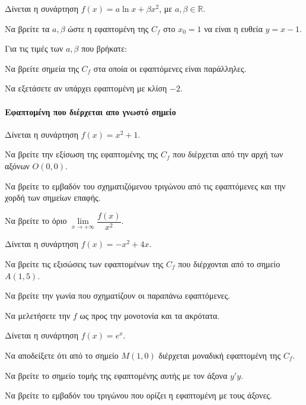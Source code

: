 \documentclass[11pt,a4paper,modern]{FFExercises}
\begin{document}
\askhsh
Δίνεται η συνάρτηση $ f(x)=a\ln x + \beta x^2 $, με $ a,\beta \in \mathbb{R} $.
\begin{alist}
    \item Να βρείτε τα $ a,\beta $ ώστε η εφαπτομένη της $ C_f $ στο $ x_0=1 $ να είναι η ευθεία $ y=x-1 $.
    \item Για τις τιμές των $ a,\beta $ που βρήκατε:
    \begin{alist}
        \item Να βρείτε σημεία της $ C_f $ στα οποία οι εφαπτόμενες είναι παράλληλες.
        \item Να εξετάσετε αν υπάρχει εφαπτομένη με κλίση $ -2 $.
    \end{alist}
\end{alist}

\paragraph{Εφαπτομένη που διέρχεται απο γνωστό σημείο}
\askhsh
Δίνεται η συνάρτηση $ f(x)=x^2+1 $.
\begin{alist}
    \item Να βρείτε την εξίσωση της εφαπτομένης της $ C_f $ που διέρχεται από την αρχή των αξόνων $ O(0,0) $.
    \item Να βρείτε το εμβαδόν του σχηματιζόμενου τριγώνου από τις εφαπτόμενες και την χορδή των σημείων επαφής.
    \item Να βρείτε το όριο $ \lim\limits_{x \to +\infty} \dfrac{f(x)}{x^2} $.
\end{alist}

\askhsh
Δίνεται η συνάρτηση $ f(x)=-x^2+4x $.
\begin{alist}
    \item Να βρείτε τις εξισώσεις των εφαπτομένων της $ C_f $ που διέρχονται από το σημείο $ A(1,5) $.
    \item Να βρείτε την γωνία που σχηματίζουν οι παραπάνω εφαπτόμενες.
    \item Να μελετήσετε την $ f $ ως προς την μονοτονία και τα ακρότατα.
\end{alist}

\askhsh
Δίνεται η συνάρτηση $ f(x)=e^x $.
\begin{alist}
    \item Να αποδείξετε ότι από το σημείο $ M(1,0) $ διέρχεται μοναδική εφαπτομένη της $ C_f $.
    \item Να βρείτε το σημείο τομής της εφαπτομένης αυτής με τον άξονα $ y'y $.
    \item Να βρείτε το εμβαδόν του τριγώνου που ορίζει η εφαπτομένη με τους άξονες.
\end{alist}
\end{document}
